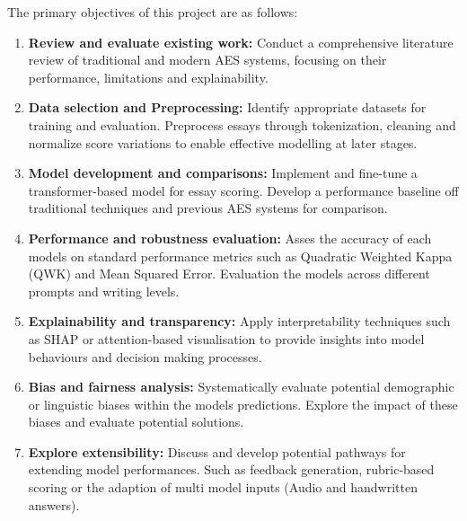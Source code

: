 \documentclass[10pt]{report}
\begin{document}
The primary objectives of this project are as follows:
\begin{enumerate}
    \item \textbf{Review and evaluate existing work: } Conduct a comprehensive literature review of traditional and modern AES systems, focusing on their performance, limitations and explainability.
    \item \textbf{Data selection and Preprocessing: } Identify appropriate datasets for training and evaluation. Preprocess essays through tokenization, cleaning and normalize score variations to enable 
    effective modelling at later stages.
    \item \textbf{Model development and comparisons: } Implement and fine-tune a transformer-based model for essay scoring. Develop a performance baseline off traditional techniques and previous AES 
    systems for comparison.
    \item \textbf{Performance and robustness evaluation: } Asses the accuracy of each models on standard performance metrics such as Quadratic Weighted Kappa (QWK) and Mean Squared Error. Evaluation the models across 
    different prompts and writing levels.
    \item \textbf{Explainability and transparency: } Apply interpretability techniques such as SHAP or attention-based visualisation to provide insights into model behaviours and decision making processes.
    \item \textbf{Bias and fairness analysis: } Systematically evaluate potential demographic or linguistic biases within the models predictions. Explore the impact of these biases and evaluate potential solutions.
    \item \textbf{ Explore extensibility: } Discuss and develop potential pathways for extending model performances. Such as feedback generation, rubric-based scoring or the adaption of multi model inputs (Audio and handwritten answers).
\end{enumerate}
\end{document}
